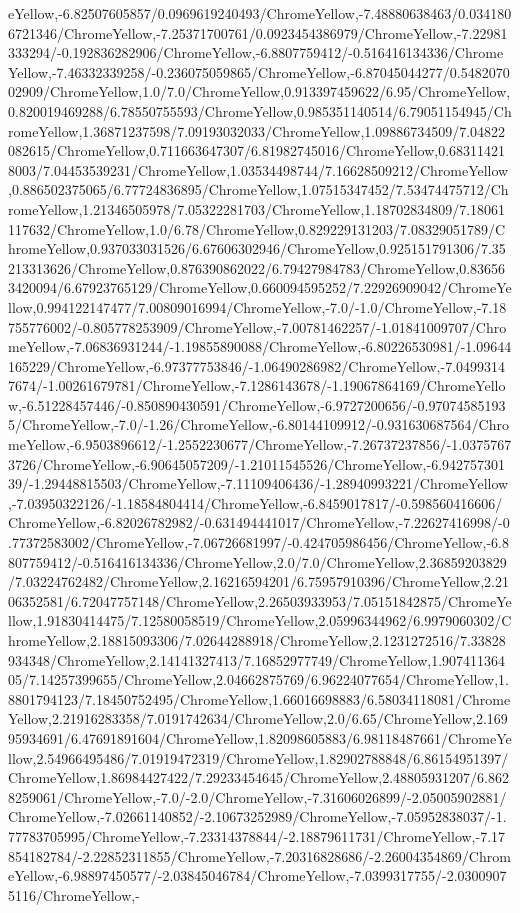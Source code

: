 {\begin{tikzternal}
eYellow,-6.82507605857/0.0969619240493/ChromeYellow,-7.48880638463/0.0341806721346/ChromeYellow,-7.25371700761/0.0923454386979/ChromeYellow,-7.22981333294/-0.192836282906/ChromeYellow,-6.8807759412/-0.516416134336/ChromeYellow,-7.46332339258/-0.236075059865/ChromeYellow,-6.87045044277/0.548207002909/ChromeYellow,1.0/7.0/ChromeYellow,0.913397459622/6.95/ChromeYellow,0.820019469288/6.78550755593/ChromeYellow,0.985351140514/6.79051154945/ChromeYellow,1.36871237598/7.09193032033/ChromeYellow,1.09886734509/7.04822082615/ChromeYellow,0.711663647307/6.81982745016/ChromeYellow,0.683114218003/7.04453539231/ChromeYellow,1.03534498744/7.16628509212/ChromeYellow,0.886502375065/6.77724836895/ChromeYellow,1.07515347452/7.53474475712/ChromeYellow,1.21346505978/7.05322281703/ChromeYellow,1.18702834809/7.18061117632/ChromeYellow,1.0/6.78/ChromeYellow,0.829229131203/7.08329051789/ChromeYellow,0.937033031526/6.67606302946/ChromeYellow,0.925151791306/7.35213313626/ChromeYellow,0.876390862022/6.79427984783/ChromeYellow,0.836563420094/6.67923765129/ChromeYellow,0.660094595252/7.22926909042/ChromeYellow,0.994122147477/7.00809016994/ChromeYellow,-7.0/-1.0/ChromeYellow,-7.18755776002/-0.805778253909/ChromeYellow,-7.00781462257/-1.01841009707/ChromeYellow,-7.06836931244/-1.19855890088/ChromeYellow,-6.80226530981/-1.09644165229/ChromeYellow,-6.97377753846/-1.06490286982/ChromeYellow,-7.04993147674/-1.00261679781/ChromeYellow,-7.1286143678/-1.19067864169/ChromeYellow,-6.51228457446/-0.850890430591/ChromeYellow,-6.9727200656/-0.970745851935/ChromeYellow,-7.0/-1.26/ChromeYellow,-6.80144109912/-0.931630687564/ChromeYellow,-6.9503896612/-1.2552230677/ChromeYellow,-7.26737237856/-1.03757673726/ChromeYellow,-6.90645057209/-1.21011545526/ChromeYellow,-6.94275730139/-1.29448815503/ChromeYellow,-7.11109406436/-1.28940993221/ChromeYellow,-7.03950322126/-1.18584804414/ChromeYellow,-6.8459017817/-0.598560416606/ChromeYellow,-6.82026782982/-0.631494441017/ChromeYellow,-7.22627416998/-0.77372583002/ChromeYellow,-7.06726681997/-0.424705986456/ChromeYellow,-6.8807759412/-0.516416134336/ChromeYellow,2.0/7.0/ChromeYellow,2.36859203829/7.03224762482/ChromeYellow,2.16216594201/6.75957910396/ChromeYellow,2.2106352581/6.72047757148/ChromeYellow,2.26503933953/7.05151842875/ChromeYellow,1.91830414475/7.12580058519/ChromeYellow,2.05996344962/6.9979060302/ChromeYellow,2.18815093306/7.02644288918/ChromeYellow,2.1231272516/7.33828934348/ChromeYellow,2.14141327413/7.16852977749/ChromeYellow,1.90741136405/7.14257399655/ChromeYellow,2.04662875769/6.96224077654/ChromeYellow,1.8801794123/7.18450752495/ChromeYellow,1.66016698883/6.58034118081/ChromeYellow,2.21916283358/7.0191742634/ChromeYellow,2.0/6.65/ChromeYellow,2.16995934691/6.47691891604/ChromeYellow,1.82098605883/6.98118487661/ChromeYellow,2.54966495486/7.01919472319/ChromeYellow,1.82902788848/6.86154951397/ChromeYellow,1.86984427422/7.29233454645/ChromeYellow,2.48805931207/6.8628259061/ChromeYellow,-7.0/-2.0/ChromeYellow,-7.31606026899/-2.05005902881/ChromeYellow,-7.02661140852/-2.10673252989/ChromeYellow,-7.05952838037/-1.77783705995/ChromeYellow,-7.23314378844/-2.18879611731/ChromeYellow,-7.17854182784/-2.22852311855/ChromeYellow,-7.20316828686/-2.26004354869/ChromeYellow,-6.98897450577/-2.03845046784/ChromeYellow,-7.0399317755/-2.03009075116/ChromeYellow,-
\end{tikzternal}}
